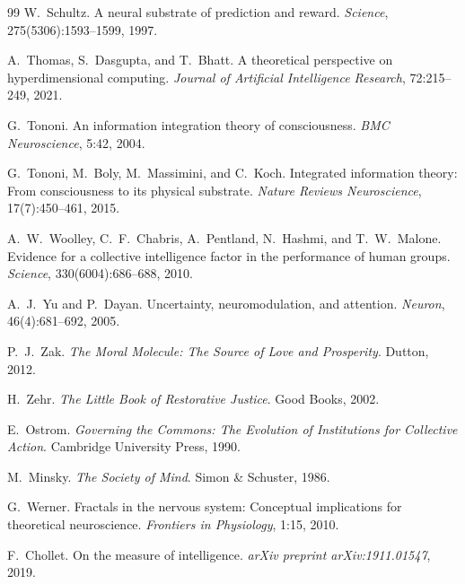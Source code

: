 \documentclass[12pt]{book}
\begin{document}
\begin{thebibliography}{99}
W.~Schultz.
\newblock A neural substrate of prediction and reward.
\newblock \textit{Science}, 275(5306):1593--1599, 1997.

A.~Thomas, S.~Dasgupta, and T.~Bhatt.
\newblock A theoretical perspective on hyperdimensional computing.
\newblock \textit{Journal of Artificial Intelligence Research}, 72:215--249, 2021.

G.~Tononi.
\newblock An information integration theory of consciousness.
\newblock \textit{BMC Neuroscience}, 5:42, 2004.

G.~Tononi, M.~Boly, M.~Massimini, and C.~Koch.
\newblock Integrated information theory: From consciousness to its physical substrate.
\newblock \textit{Nature Reviews Neuroscience}, 17(7):450--461, 2015.

A.~W.~Woolley, C.~F.~Chabris, A.~Pentland, N.~Hashmi, and T.~W.~Malone.
\newblock Evidence for a collective intelligence factor in the performance of human groups.
\newblock \textit{Science}, 330(6004):686--688, 2010.

A.~J.~Yu and P.~Dayan.
\newblock Uncertainty, neuromodulation, and attention.
\newblock \textit{Neuron}, 46(4):681--692, 2005.

P.~J.~Zak.
\newblock \textit{The Moral Molecule: The Source of Love and Prosperity}.
\newblock Dutton, 2012.

H.~Zehr.
\newblock \textit{The Little Book of Restorative Justice}.
\newblock Good Books, 2002.

E.~Ostrom.
\newblock \textit{Governing the Commons: The Evolution of Institutions for Collective Action}.
\newblock Cambridge University Press, 1990.

M.~Minsky.
\newblock \textit{The Society of Mind}.
\newblock Simon \& Schuster, 1986.

G.~Werner.
\newblock Fractals in the nervous system: Conceptual implications for theoretical neuroscience.
\newblock \textit{Frontiers in Physiology}, 1:15, 2010.

F.~Chollet.
\newblock On the measure of intelligence.
\newblock \textit{arXiv preprint arXiv:1911.01547}, 2019.


\end{thebibliography}
\end{document}

